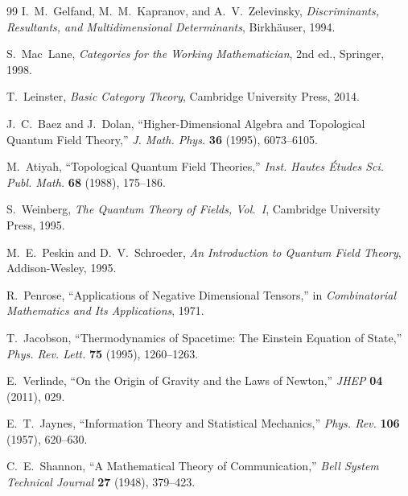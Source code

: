 \documentclass[12pt, oneside]{amsart}
\theoremstyle{plain}
\theoremstyle{definition}
\theoremstyle{remark}
\begin{document}
\begin{thebibliography}{99}
I.~M.~Gelfand, M.~M.~Kapranov, and A.~V.~Zelevinsky,
\newblock \textit{Discriminants, Resultants, and Multidimensional Determinants},
\newblock Birkh\"{a}user, 1994.


S.~Mac~Lane,
\newblock \textit{Categories for the Working Mathematician},
\newblock 2nd ed., Springer, 1998.

T.~Leinster,
\newblock \textit{Basic Category Theory},
\newblock Cambridge University Press, 2014.

J.~C.~Baez and J.~Dolan,
\newblock ``Higher-Dimensional Algebra and Topological Quantum Field Theory,''
\newblock \textit{J. Math. Phys.} \textbf{36} (1995), 6073--6105.

M.~Atiyah,
\newblock ``Topological Quantum Field Theories,''
\newblock \textit{Inst. Hautes \'{E}tudes Sci. Publ. Math.} \textbf{68} (1988), 175--186.


S.~Weinberg,
\newblock \textit{The Quantum Theory of Fields, Vol.\ I},
\newblock Cambridge University Press, 1995.

M.~E.~Peskin and D.~V.~Schroeder,
\newblock \textit{An Introduction to Quantum Field Theory},
\newblock Addison-Wesley, 1995.

R.~Penrose,
\newblock ``Applications of Negative Dimensional Tensors,''
\newblock in \textit{Combinatorial Mathematics and Its Applications}, 1971.


T.~Jacobson,
\newblock ``Thermodynamics of Spacetime: The Einstein Equation of State,''
\newblock \textit{Phys. Rev. Lett.} \textbf{75} (1995), 1260--1263.

E.~Verlinde,
\newblock ``On the Origin of Gravity and the Laws of Newton,''
\newblock \textit{JHEP} \textbf{04} (2011), 029.

E.~T.~Jaynes,
\newblock ``Information Theory and Statistical Mechanics,''
\newblock \textit{Phys. Rev.} \textbf{106} (1957), 620--630.

C.~E.~Shannon,
\newblock ``A Mathematical Theory of Communication,''
\newblock \textit{Bell System Technical Journal} \textbf{27} (1948), 379--423.


\end{thebibliography}
\end{document}
